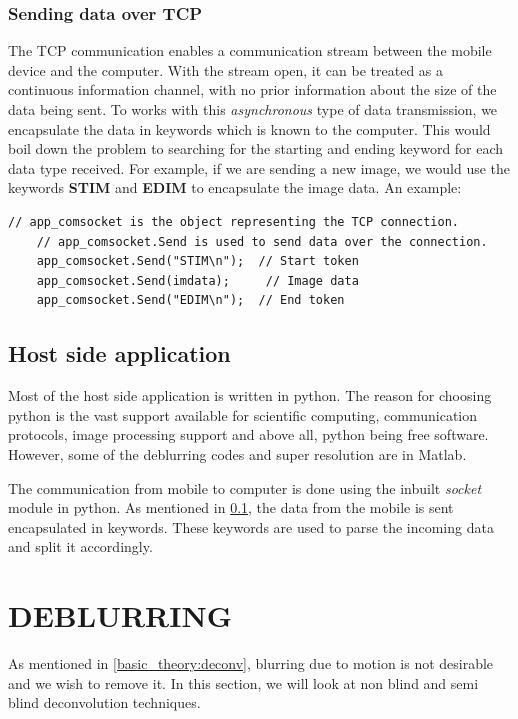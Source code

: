 \documentclass[BTech]{iitmdiss}
\begin{document}
\subsection{Sending data over TCP}
\label{device:device_app:tcp}
The TCP communication enables a communication stream between the mobile
device and the computer. With the stream open, it can be treated as a 
continuous information channel, with no prior information about the size
of the data being sent. To works with this \emph{asynchronous} type of
data transmission, we encapsulate the data in keywords which is known to
the computer. This would boil down the problem to searching for the 
starting and ending keyword for each data type received. For example, if
we are sending a new image, we would use the keywords \textbf{STIM} and
\textbf{EDIM} to encapsulate the image data. An example: 

\begin{singlespacing}
\begin{lstlisting}[style=sharpclisting]
    // app_comsocket is the object representing the TCP connection.
    // app_comsocket.Send is used to send data over the connection.
    app_comsocket.Send("STIM\n");  // Start token
    app_comsocket.Send(imdata);     // Image data
    app_comsocket.Send("EDIM\n");  // End token
\end{lstlisting}
\end{singlespacing}

\section{Host side application}
\label{device:host}
Most of the host side application is written in python. The reason for 
choosing python is the vast support available for scientific computing,
communication protocols, image processing support and above all, python
being free software. However, some of the deblurring codes and 
super resolution are in Matlab.

The communication from mobile to computer is done using the inbuilt
\emph{socket} module in python. As mentioned in 
\ref{device:device_app:tcp}, the data from the mobile is sent
encapsulated in keywords. These keywords are used to parse the incoming
data and split it accordingly. 

\pagebreak

\chapter{DEBLURRING}
\label{chap:deblurring}
As mentioned in \ref*{basic_theory:deconv}, blurring due to motion is
not desirable and we wish to remove it. In this section, we will look at
non blind and semi blind deconvolution techniques. 
\pagebreak
\end{document}
